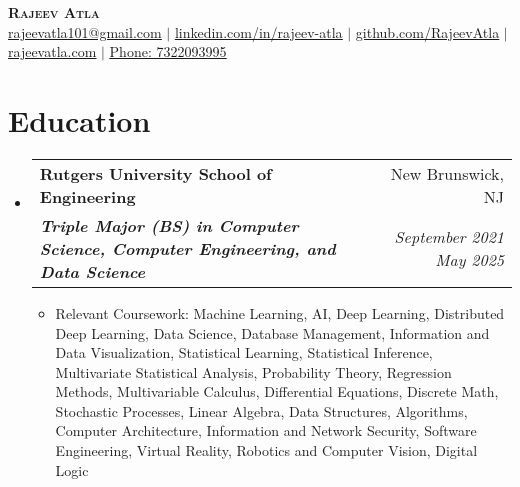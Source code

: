 \documentclass[letterpaper, 11pt]{article}
\makeatletter
\newcommand{\resumeSubheading}[4]{ %
  \vspace{-2pt}\item
    \begin{tabular*}{0.99\textwidth}[t]{l@{\extracolsep{\fill}}r}
      \textbf{#1} & #2 \\
      \textit{\small#3} & \textit{\small #4} \\
    \end{tabular*}\vspace{-7pt}
}
\newcommand{\resumeSubHeadingListStart}{\begin{itemize}[leftmargin=0.15in, label={}]}
\newcommand{\resumeSubHeadingListEnd}{\end{itemize}}
\makeatother
\begin{document}


\begin{center}
    \textbf{\Huge \scshape Rajeev Atla} \\
    \href{mailto:rajeevatla101@gmail.com}{\underline{rajeevatla101@gmail.com}} $|$ 
    \href{https://www.linkedin.com/in/rajeev-atla/}{\underline{linkedin.com/in/rajeev-atla}} $|$
    \href{https://github.com/RajeevAtla}{\underline{github.com/RajeevAtla}} $|$
    \href{https://rajeevatla.com}{\underline{rajeevatla.com}} $|$
    \href{tel:7322093995}{\underline{Phone: 7322093995}}
\end{center}

\vspace{-15pt}

\section{Education}
  \resumeSubHeadingListStart{}
    \resumeSubheading %
      {Rutgers University \textendash{} School of Engineering}{New Brunswick, NJ}
      {\textbf{Triple Major (BS) in Computer Science, Computer Engineering, and Data Science}}{September 2021 \textendash{} May 2025}
      \begin{itemize}[leftmargin=0.25in, label={}]
      \item Relevant Coursework: Machine Learning, AI, Deep Learning, Distributed Deep Learning, Data Science, Database Management, Information and Data Visualization, Statistical Learning, Statistical Inference, Multivariate Statistical Analysis, Probability Theory, Regression Methods, Multivariable Calculus, Differential Equations, Discrete Math, Stochastic Processes, Linear Algebra, Data Structures, Algorithms, Computer Architecture, Information and Network Security, Software Engineering, Virtual Reality, Robotics and Computer Vision, Digital Logic \\
\end{itemize}
  \resumeSubHeadingListEnd{}

\vspace{-37pt}

\end{document}

